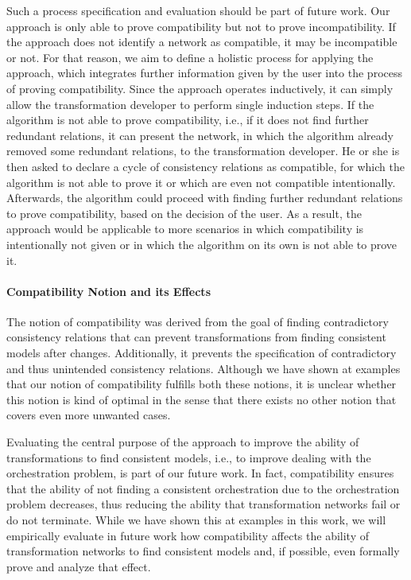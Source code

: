 Such a process specification and evaluation should be part of future work.
Our approach is only able to prove compatibility but not to prove incompatibility. If the approach does not identify a network as compatible, it may be incompatible or not.
For that reason, we aim to define a holistic process for applying the approach, which integrates further information given by the user into the process of proving compatibility.
Since the approach operates inductively, it can simply allow the transformation developer to perform single induction steps.
If the algorithm is not able to prove compatibility, i.e., if it does not find further redundant relations, it can present the network, in which the algorithm already removed some redundant relations, to the transformation developer.
He or she is then asked to declare a cycle of consistency relations as compatible, for which the algorithm is not able to prove it or which are even not compatible intentionally.
Afterwards, the algorithm could proceed with finding further redundant relations to prove compatibility, based on the decision of the user.
As a result, the approach would be applicable to more scenarios in which compatibility is intentionally not given or in which the algorithm on its own is not able to prove it.

\paragraph{Compatibility Notion and its Effects}
The notion of compatibility was derived from the goal of finding contradictory consistency relations that can prevent transformations from finding consistent models after changes.
Additionally, it prevents the specification of contradictory and thus unintended consistency relations.
Although we have shown at examples that our notion of compatibility fulfills both these notions, it is unclear whether this notion is kind of optimal in the sense that there exists no other notion that covers even more unwanted cases.

Evaluating the central purpose of the approach to improve the ability of transformations to find consistent models, i.e., to improve dealing with the orchestration problem, is part of our future work.
In fact, compatibility ensures that the ability of not finding a consistent orchestration due to the orchestration problem decreases, thus reducing the ability that transformation networks fail or do not terminate.
While we have shown this at examples in this work, we will empirically evaluate in future work how compatibility affects the ability of transformation networks to find consistent models and, if possible, even formally prove and analyze that effect. 

